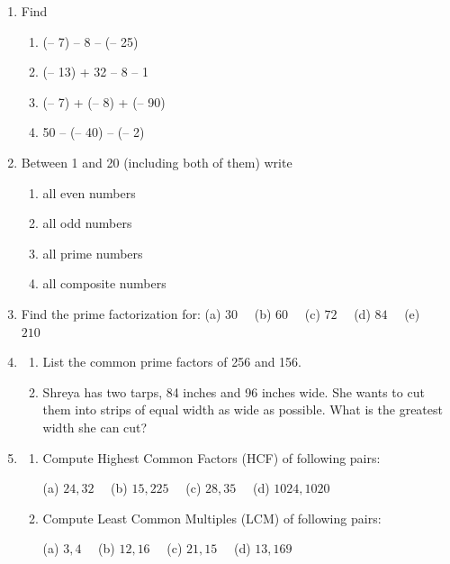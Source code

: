 \documentclass[a4paper,leqno,12pt]{amsart}
\begin{document}
\begin{enumerate}
\item Find
\begin{enumerate}
\item (– 7) – 8 – (– 25)
\item (– 13) + 32 – 8 – 1
\item (– 7) + (– 8) + (– 90)
\item 50 – (– 40) – (– 2)
\end{enumerate}

\item Between 1 and 20 (including both of them) write 
\begin{enumerate}
 \item all even numbers
 \item all odd numbers
 \item all prime numbers
 \item all composite numbers
\end{enumerate}

\item Find the prime factorization for:
(a) $30 \quad$ (b) $60 \quad$ (c) $72 \quad$ (d) $84 \quad$ (e) $210 \quad$

\item
\begin{enumerate}
 \item List the common prime factors of 256 and 156.
 \item Shreya has two tarps, 84 inches and 96 inches wide. She wants to cut them into strips of equal width as wide as possible. 
 What is the greatest width she can cut?
\end{enumerate}

\item 
\begin{enumerate}
\item Compute Highest Common Factors (HCF) of following pairs:

	(a) $24, 32 \quad$ (b) $15, 225 \quad$  (c) $28, 35 \quad $ (d) $1024, 1020$
	
\item Compute Least Common Multiples (LCM) of following pairs:

	(a) $3, 4 \quad$ (b) $12, 16 \quad $ (c) $21, 15 \quad $ (d) $13, 169$ 
\end{enumerate}



\end{enumerate}


\end{document}
